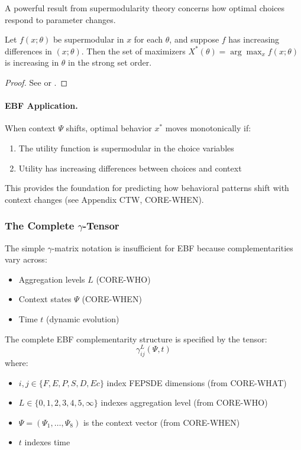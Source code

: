 A powerful result from supermodularity theory concerns how optimal choices 
respond to parameter changes.

\begin{theorem}
\label{thm:monotone-statics}
Let $f(x; \theta)$ be supermodular in $x$ for each $\theta$, and suppose 
$f$ has increasing differences in $(x; \theta)$. Then the set of maximizers 
$X^*(\theta) = \arg\max_x f(x; \theta)$ is increasing in $\theta$ in the 
strong set order.
\end{theorem}

\begin{proof}
See \citet{milgromshannon1994} or \citet{topkis1998}.
\end{proof}

\paragraph{EBF Application.}
When context $\Psi$ shifts, optimal behavior $x^*$ moves monotonically if:
\begin{enumerate}
    \item The utility function is supermodular in the choice variables
    \item Utility has increasing differences between choices and context
\end{enumerate}

This provides the foundation for predicting how behavioral patterns shift 
with context changes (see Appendix CTW, CORE-WHEN).

\subsubsection{The Complete $\gamma$-Tensor}

The simple $\gamma$-matrix notation is insufficient for EBF because 
complementarities vary across:
\begin{itemize}
    \item Aggregation levels $L$ (CORE-WHO)
    \item Context states $\Psi$ (CORE-WHEN)
    \item Time $t$ (dynamic evolution)
\end{itemize}

\begin{definition}
\label{def:gamma-tensor}
The complete EBF complementarity structure is specified by the tensor:
\begin{equation}
    \gamma^L_{ij}(\Psi, t)
    \label{eq:gamma-tensor}
\end{equation}
where:
\begin{itemize}
    \item $i, j \in \{F, E, P, S, D, Ec\}$ index FEPSDE dimensions (from CORE-WHAT)
    \item $L \in \{0, 1, 2, 3, 4, 5, \infty\}$ indexes aggregation level (from CORE-WHO)
    \item $\Psi = (\Psi_1, \ldots, \Psi_8)$ is the context vector (from CORE-WHEN)
    \item $t$ indexes time
\end{itemize}
\end{definition}

